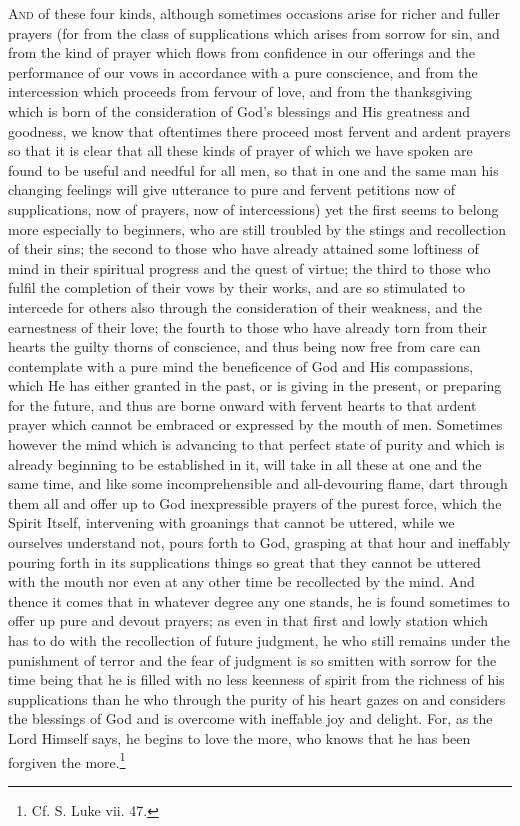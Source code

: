 \textsc{And} of these four kinds, although sometimes occasions arise for richer and fuller prayers (for from the class of supplications which arises from sorrow for sin, and from the kind of prayer which flows from confidence in our offerings and the performance of our vows in accordance with a pure conscience, and from the intercession which proceeds from fervour of love, and from the thanksgiving which is born of the consideration of God’s blessings and His greatness and goodness, we know that oftentimes there proceed most fervent and ardent prayers so that it is clear that all these kinds of prayer of which we have spoken are found to be useful and needful for all men, so that in one and the same man his changing feelings will give utterance to pure and fervent petitions now of supplications, now of prayers, now of intercessions) yet the first seems to belong more especially to beginners, who are still troubled by the stings and recollection of their sins; the second to those who have already attained some loftiness of mind in their spiritual progress and the quest of virtue; the third to those who fulfil the completion of their vows by their works, and are so stimulated to intercede for others also through the consideration of their weakness, and the earnestness of their love; the fourth to those who have already torn from their hearts the guilty thorns of conscience, and thus being now free from care can contemplate with a pure mind the beneficence of God and His compassions, which He has either granted in the past, or is giving in the present, or preparing for the future, and thus are borne onward with fervent hearts to that ardent prayer which cannot be embraced or expressed by the mouth of men. Sometimes however the mind which is advancing to that perfect state of purity and which is already beginning to be established in it, will take in all these at one and the same time, and like some incomprehensible and all-devouring flame, dart through them all and offer up to God inexpressible prayers of the purest force, which the Spirit Itself, intervening with groanings that cannot be uttered, while we ourselves understand not, pours forth to God, grasping at that hour and ineffably pouring forth in its supplications things so great that they cannot be uttered with the mouth nor even at any other time be recollected by the mind. And thence it comes that in whatever degree any one stands, he is found sometimes to offer up pure and devout prayers; as even in that first and lowly station which has to do with the recollection of future judgment, he who still remains under the punishment of terror and the fear of judgment is so smitten with sorrow for the time being that he is filled with no less keenness of spirit from the richness of his supplications than he who through the purity of his heart gazes on and considers the blessings of God and is overcome with ineffable joy and delight. For, as the Lord Himself says, he begins to love the more, who knows that he has been forgiven the more.\footnote{Cf. S. Luke vii. 47.}

